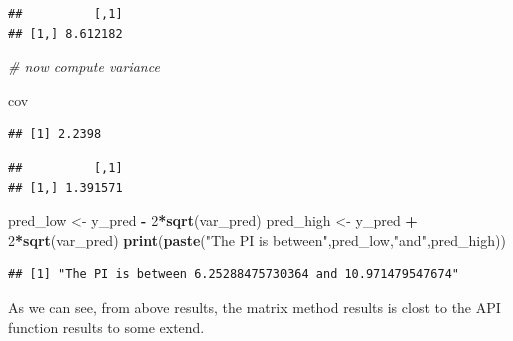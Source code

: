 \documentclass[]{article}
\newenvironment{Shaded}{\begin{snugshade}}{\end{snugshade}}
\newcommand{\KeywordTok}[1]{\textcolor[rgb]{0.13,0.29,0.53}{\textbf{#1}}}
\newcommand{\DecValTok}[1]{\textcolor[rgb]{0.00,0.00,0.81}{#1}}
\newcommand{\StringTok}[1]{\textcolor[rgb]{0.31,0.60,0.02}{#1}}
\newcommand{\CommentTok}[1]{\textcolor[rgb]{0.56,0.35,0.01}{\textit{#1}}}
\newcommand{\OperatorTok}[1]{\textcolor[rgb]{0.81,0.36,0.00}{\textbf{#1}}}
\newcommand{\NormalTok}[1]{#1}
\begin{document}
\begin{Shaded}
\end{Shaded}

\begin{verbatim}
##          [,1]
## [1,] 8.612182
\end{verbatim}

\begin{Shaded}
\begin{Highlighting}[]
\CommentTok{# now compute variance}

\NormalTok{cov}
\end{Highlighting}
\end{Shaded}

\begin{verbatim}
## [1] 2.2398
\end{verbatim}

\begin{Shaded}
\end{Shaded}

\begin{verbatim}
##          [,1]
## [1,] 1.391571
\end{verbatim}

\begin{Shaded}
\begin{Highlighting}[]
\NormalTok{pred_low <-}\StringTok{ }\NormalTok{y_pred }\OperatorTok{-}\StringTok{ }\DecValTok{2}\OperatorTok{*}\KeywordTok{sqrt}\NormalTok{(var_pred)}
\NormalTok{pred_high <-}\StringTok{ }\NormalTok{y_pred }\OperatorTok{+}\StringTok{ }\DecValTok{2}\OperatorTok{*}\KeywordTok{sqrt}\NormalTok{(var_pred)}
\KeywordTok{print}\NormalTok{(}\KeywordTok{paste}\NormalTok{(}\StringTok{"The PI is between"}\NormalTok{,pred_low,}\StringTok{"and"}\NormalTok{,pred_high))}
\end{Highlighting}
\end{Shaded}

\begin{verbatim}
## [1] "The PI is between 6.25288475730364 and 10.971479547674"
\end{verbatim}

As we can see, from above results, the matrix method results is clost to
the API function results to some extend.
\end{document}
